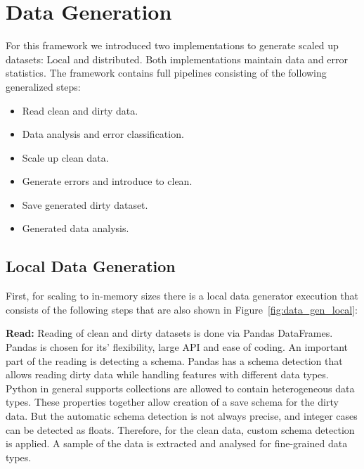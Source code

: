 \section{Data Generation}
\label{sec:data_gen}
For this framework we introduced two implementations to generate scaled up datasets: Local and distributed.
Both implementations maintain data and error statistics. 
The framework contains full pipelines consisting of the following generalized steps:

\begin{itemize}
    \item Read clean and dirty data.
    \item Data analysis and error classification.
    \item Scale up clean data.
    \item Generate errors and introduce to clean.
    \item Save generated dirty dataset.
    \item Generated data analysis.
\end{itemize}

\subsection{Local Data Generation}
\label{sec:local_generator}


First, for scaling to in-memory sizes there is a local data generator execution that consists of the following steps that are also shown in Figure~\ref{fig:data_gen_local}:

\textbf{Read:} 
Reading of clean and dirty datasets is done via Pandas DataFrames. 
Pandas is chosen for its' flexibility, large API and ease of coding. 
An important part of the reading is detecting a schema.
Pandas has a schema detection that allows reading dirty data while handling features with different data types. 
Python in general supports collections are allowed to contain heterogeneous data types. 
These properties together allow creation of a save schema for the dirty data.
But the automatic schema detection is not always precise, and integer cases can be detected as floats. 
Therefore, for the clean data, custom schema detection is applied. A sample of the data is extracted and analysed for fine-grained data types. 

